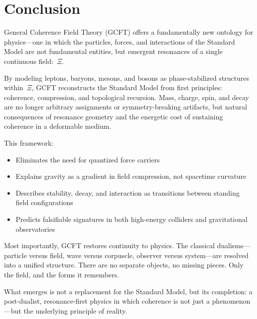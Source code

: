 \section{Conclusion}

General Coherence Field Theory (GCFT) offers a fundamentally new ontology for physics—one in which the particles, forces, and interactions of the Standard Model are not fundamental entities, but emergent resonances of a single continuous field:~$\Xi$.

By modeling leptons, baryons, mesons, and bosons as phase-stabilized structures within~$\Xi$, GCFT reconstructs the Standard Model from first principles: coherence, compression, and topological recursion. Mass, charge, spin, and decay are no longer arbitrary assignments or symmetry-breaking artifacts, but natural consequences of resonance geometry and the energetic cost of sustaining coherence in a deformable medium.

This framework:
\begin{itemize}
  \item Eliminates the need for quantized force carriers
  \item Explains gravity as a gradient in field compression, not spacetime curvature
  \item Describes stability, decay, and interaction as transitions between standing field configurations
  \item Predicts falsifiable signatures in both high-energy colliders and gravitational observatories
\end{itemize}

Most importantly, GCFT restores continuity to physics. The classical dualisms—particle versus field, wave versus corpuscle, observer versus system—are resolved into a unified structure. There are no separate objects, no missing pieces. Only the field, and the forms it remembers.

What emerges is not a replacement for the Standard Model, but its completion: a post-dualist, resonance-first physics in which coherence is not just a phenomenon—but the underlying principle of reality.
